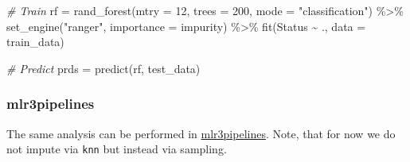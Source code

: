 \documentclass[
]{scrbook}
\newenvironment{Shaded}{\begin{snugshade}}{\end{snugshade}}
\newcommand{\AttributeTok}[1]{\textcolor[rgb]{0.77,0.63,0.00}{#1}}
\newcommand{\CommentTok}[1]{\textcolor[rgb]{0.56,0.35,0.01}{\textit{#1}}}
\newcommand{\DecValTok}[1]{\textcolor[rgb]{0.00,0.00,0.81}{#1}}
\newcommand{\FunctionTok}[1]{\textcolor[rgb]{0.00,0.00,0.00}{#1}}
\newcommand{\NormalTok}[1]{#1}
\newcommand{\OtherTok}[1]{\textcolor[rgb]{0.56,0.35,0.01}{#1}}
\newcommand{\SpecialCharTok}[1]{\textcolor[rgb]{0.00,0.00,0.00}{#1}}
\newcommand{\StringTok}[1]{\textcolor[rgb]{0.31,0.60,0.02}{#1}}
\renewenvironment{Shaded} {\begin{snugshade}\small} {\end{snugshade}}
\begin{document}
\begin{Shaded}
\begin{Highlighting}[]
\CommentTok{\# Train}
\NormalTok{rf }\OtherTok{=} \FunctionTok{rand\_forest}\NormalTok{(}\AttributeTok{mtry =} \DecValTok{12}\NormalTok{, }\AttributeTok{trees =} \DecValTok{200}\NormalTok{, }\AttributeTok{mode =} \StringTok{"classification"}\NormalTok{) }\SpecialCharTok{\%\textgreater{}\%}
  \FunctionTok{set\_engine}\NormalTok{(}\StringTok{"ranger"}\NormalTok{, }\AttributeTok{importance =} \StringTok{\textquotesingle{}impurity\textquotesingle{}}\NormalTok{) }\SpecialCharTok{\%\textgreater{}\%}
  \FunctionTok{fit}\NormalTok{(Status }\SpecialCharTok{\textasciitilde{}}\NormalTok{ ., }\AttributeTok{data =}\NormalTok{ train\_data)}

\CommentTok{\# Predict}
\NormalTok{prds }\OtherTok{=} \FunctionTok{predict}\NormalTok{(rf, test\_data)}
\end{Highlighting}
\end{Shaded}

\hypertarget{mlr3pipelines-2}{%
\subsubsection{mlr3pipelines}\label{mlr3pipelines-2}}

The same analysis can be performed in \href{https://cran.r-project.org/package=mlr3pipelines}{mlr3pipelines}.
Note, that for now we do not impute via \texttt{knn} but instead via sampling.
\end{document}
